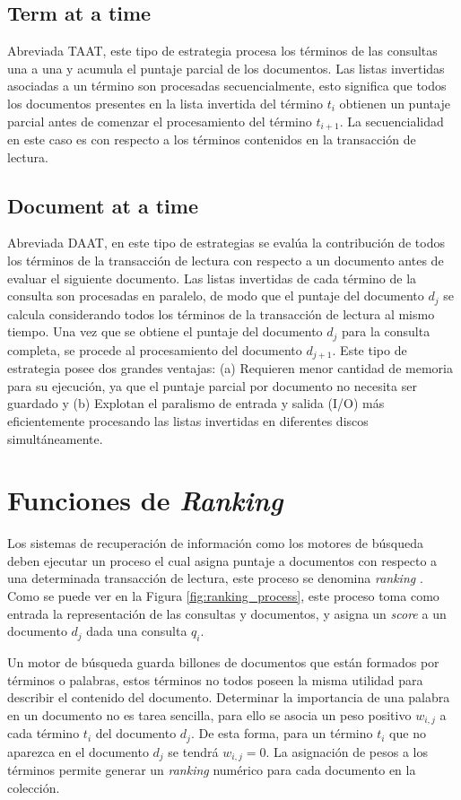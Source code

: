 \subsection{Term at a time}
Abreviada TAAT, este tipo de estrategia procesa los términos de las consultas una a una y acumula el puntaje parcial de los documentos. Las listas invertidas asociadas a un término son procesadas secuencialmente, esto significa que todos los documentos presentes en la lista invertida del término $t_{i}$ obtienen un puntaje parcial antes de comenzar el procesamiento del término $t_{i+1}$. La secuencialidad en este caso es con respecto a los términos contenidos en la transacción de lectura.

\subsection{Document at a time}
Abreviada DAAT, en este tipo de estrategias se evalúa la contribución de todos los términos de la transacción de lectura con respecto a un documento antes de evaluar el siguiente documento. Las listas invertidas de cada término de la consulta son procesadas en paralelo, de modo que el puntaje del documento $d_{j}$ se calcula considerando todos los términos de la transacción de lectura al mismo tiempo. Una vez que se obtiene el puntaje del documento $d_{j}$ para la consulta completa, se procede al procesamiento del documento $d_{j+1}$. Este tipo de estrategia posee dos grandes ventajas: (a) Requieren menor cantidad de memoria para su ejecución, ya que el puntaje parcial por documento no necesita ser guardado y (b) Explotan el paralismo de entrada y salida (I/O) más eficientemente procesando las listas invertidas en diferentes discos simultáneamente.

\section{Funciones de \textit{Ranking}}
\label{marco:ranking}
Los sistemas de recuperación de información como los motores de búsqueda deben ejecutar un proceso el cual asigna puntaje a documentos con respecto a una determinada transacción de lectura, este proceso se denomina \textit{ranking} \citep{Baeza-Yates:2011}. Como se puede ver en la Figura \ref{fig:ranking_process}, este proceso toma como entrada la representación de las consultas y documentos, y asigna un \textit{score} a un documento $d_{j}$ dada una consulta $q_{i}$.

Un motor de búsqueda guarda billones de documentos que están formados por términos o palabras, estos términos no todos poseen la misma utilidad para describir el contenido del documento. Determinar la importancia de una palabra en un documento no es tarea sencilla, para ello se asocia un peso positivo $w_{i,j}$ a cada término $t_{i}$ del documento $d_{j}$. De esta forma, para un término $t_{i}$ que no aparezca en el documento $d_{j}$ se tendrá $w_{i,j} = 0$. La asignación de pesos a los términos permite generar un \textit{ranking} numérico para cada documento en la colección.

